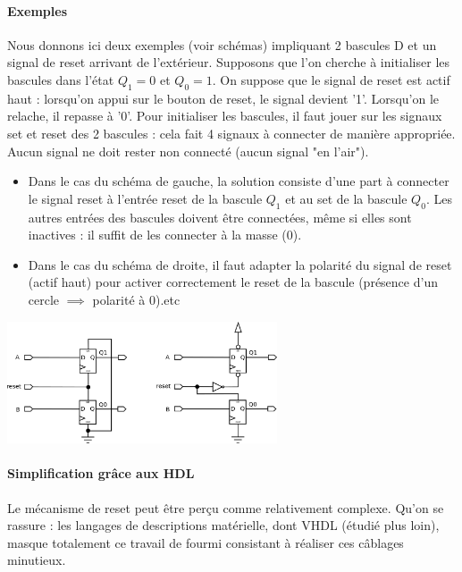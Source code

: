 \paragraph{Exemples}
Nous donnons ici deux exemples (voir schémas) impliquant 2 bascules D et un signal de reset arrivant de l'extérieur. Supposons que l'on cherche à initialiser les bascules dans l'état $Q_1=0$ et $Q_0=1$.
On suppose que le signal de reset est actif haut : lorsqu'on appui sur le bouton de reset, le signal devient '1'. Lorsqu'on le relache, il repasse à '0'. Pour initialiser les bascules,
 il faut jouer sur les signaux set et reset des 2 bascules : cela fait 4 signaux à connecter de manière appropriée. Aucun signal ne doit rester non connecté (aucun signal "en l'air").
 \begin{itemize}
   \item Dans le cas du schéma de gauche, la solution consiste d'une part à connecter le signal reset à l'entrée reset de la bascule $Q_1$ et au set de la bascule $Q_0$. Les autres entrées des bascules doivent être connectées, même si elles sont inactives : il suffit
   de les connecter à la masse (0).
   \item Dans le cas du schéma de droite, il faut adapter la polarité du signal de reset (actif haut) pour activer correctement le reset de la bascule (présence d'un cercle $\implies$ polarité à 0).etc
 \end{itemize}


 \begin{center}
   \includegraphics[width=8cm]{./figures/dff_init.png}
 \end{center}

\paragraph{Simplification grâce aux HDL}
Le mécanisme de reset peut être perçu comme relativement complexe. Qu'on se rassure : les langages de descriptions matérielle, dont VHDL (étudié plus loin),
masque totalement ce travail de fourmi consistant à réaliser ces câblages minutieux.

